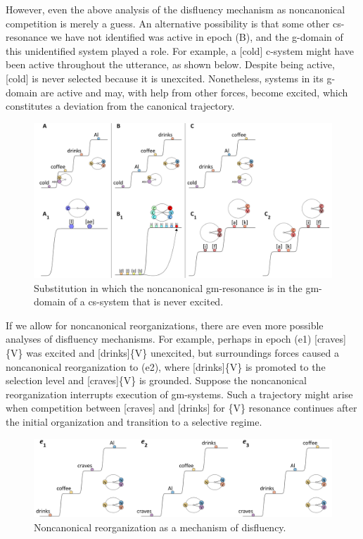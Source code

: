   However, even the above analysis of the disfluency mechanism as noncanonical competition is merely a guess. An alternative possibility is that some other cs-resonance we have not identified was active in epoch (B), and the g-domain of this unidentified system played a role. For example, a [cold] c-system might have been active throughout the utterance, as shown below. Despite being active, [cold] is never selected because it is unexcited. Nonetheless, systems in its g-domain are active and may, with help from other forces, become excited, which constitutes a deviation from the canonical trajectory.

  
\begin{figure}
\includegraphics[width=\textwidth]{figures/Tilsen-img59.png}
\caption{Substitution in which the noncanonical gm-resonance is in the gm-domain of a cs-system that is never excited.}
\label{fig:4:8b}
\end{figure}
 

  If we allow for noncanonical reorganizations, there are even more possible analyses of disfluency mechanisms. For example, perhaps in epoch (e1) [craves]\{V\} was excited and [drinks]\{V\} unexcited, but surroundings forces caused a noncanonical reorganization to (e2), where [drinks]\{V\} is promoted to the selection level and [craves]\{V\} is grounded. Suppose the noncanonical reorganization interrupts execution of gm-systems. Such a trajectory might arise when competition between [craves] and [drinks] for \{V\} resonance continues after the initial organization and transition to a selective regime. 

  
\begin{figure}
\includegraphics[width=\textwidth]{figures/Tilsen-img60.png}
\caption{Noncanonical reorganization as a mechanism of disfluency.}
\label{fig:4:10}
\end{figure}
 

